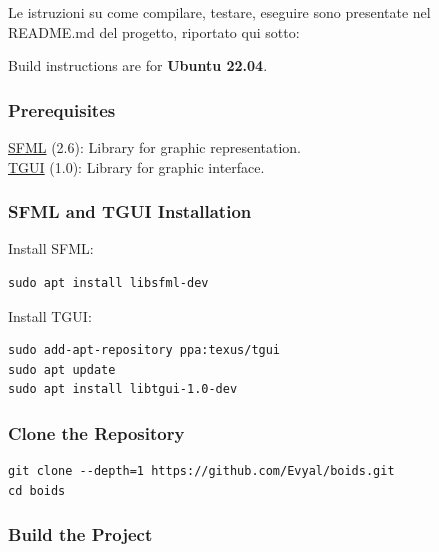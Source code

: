\documentclass[10pt,a4paper]{article}
\begin{document}
Le istruzioni su come compilare, testare, eseguire sono presentate nel README.md del progetto, riportato qui sotto:

Build instructions are for \textbf{Ubuntu 22.04}.

\subsubsection{Prerequisites}

\href{https://github.com/SFML/SFML}{SFML} (2.6): Library for graphic representation. \\
\href{https://github.com/texus/TGUI}{TGUI} (1.0): Library for graphic interface.

\subsubsection{SFML and TGUI Installation}

Install SFML:

\begin{lstlisting}[style=github-bash]
sudo apt install libsfml-dev
\end{lstlisting}

Install TGUI:

\begin{lstlisting}[style=github-bash]
sudo add-apt-repository ppa:texus/tgui
sudo apt update
sudo apt install libtgui-1.0-dev
\end{lstlisting}

\subsubsection{Clone the Repository}

\begin{lstlisting}[style=github-bash]
git clone --depth=1 https://github.com/Evyal/boids.git
cd boids
\end{lstlisting}

\subsubsection{Build the Project}
\end{document}
